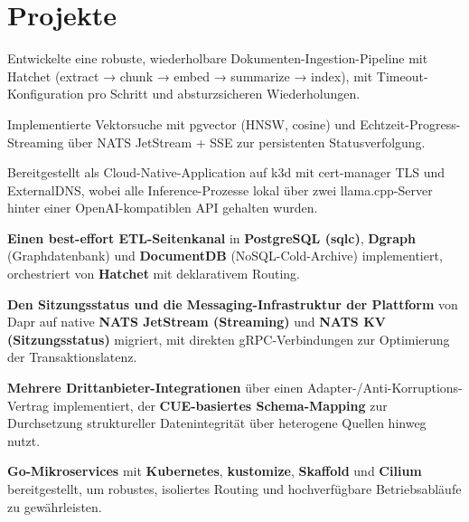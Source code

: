 \documentclass[10pt,a4paper]{resume}
\begin{document}
\vspace{2pt}

\section{Projekte}

\bullets
  \item Entwickelte eine robuste, wiederholbare Dokumenten-Ingestion-Pipeline mit Hatchet (extract → chunk → embed → summarize → index), mit Timeout-Konfiguration pro Schritt und absturzsicheren Wiederholungen.
  \item Implementierte Vektorsuche mit pgvector (HNSW, cosine) und Echtzeit-Progress-Streaming über NATS JetStream + SSE zur persistenten Statusverfolgung.
  \item Bereitgestellt als Cloud-Native-Application auf k3d mit cert-manager TLS und ExternalDNS, wobei alle Inference-Prozesse lokal über zwei llama.cpp-Server hinter einer OpenAI-kompatiblen API gehalten wurden.
\bulletsend
\vspace{1.0pt}
\bullets
  \item \textbf{Einen best-effort ETL-Seitenkanal} in \textbf{PostgreSQL (sqlc)}, \textbf{Dgraph} (Graphdatenbank) und \textbf{DocumentDB} (NoSQL-Cold-Archive) implementiert, orchestriert von \textbf{Hatchet} mit deklarativem Routing.
  \item \textbf{Den Sitzungsstatus und die Messaging-Infrastruktur der Plattform} von Dapr auf native \textbf{NATS JetStream (Streaming)} und \textbf{NATS KV (Sitzungsstatus)} migriert, mit direkten gRPC-Verbindungen zur Optimierung der Transaktionslatenz.
  \item \textbf{Mehrere Drittanbieter-Integrationen} über einen Adapter-/Anti-Korruptions-Vertrag implementiert, der \textbf{CUE-basiertes Schema-Mapping} zur Durchsetzung struktureller Datenintegrität über heterogene Quellen hinweg nutzt.
  \item \textbf{Go-Mikroservices} mit \textbf{Kubernetes}, \textbf{kustomize}, \textbf{Skaffold} und \textbf{Cilium} bereitgestellt, um robustes, isoliertes Routing und hochverfügbare Betriebsabläufe zu gewährleisten.
\bulletsend
\end{document}
